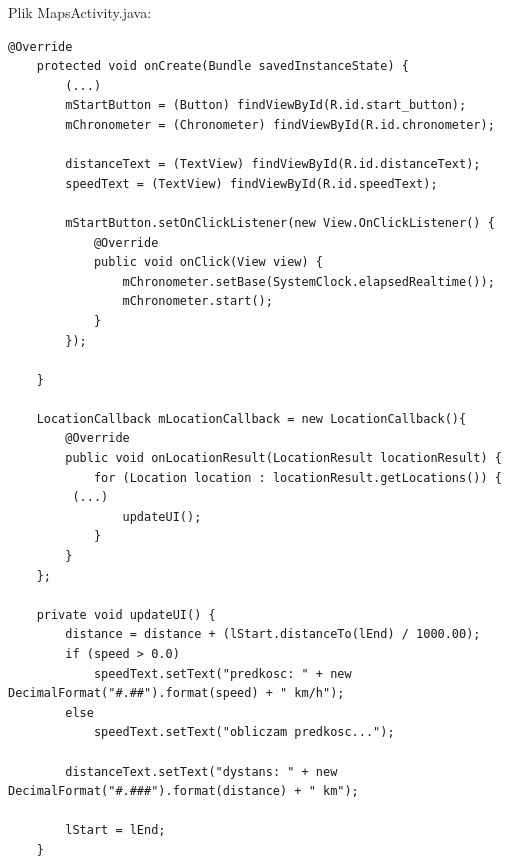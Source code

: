 \documentclass[a4paper]{article}
\begin{document}
Plik MapsActivity.java:
\begin{lstlisting}[style=java]
    @Override
    protected void onCreate(Bundle savedInstanceState) {
        (...)
        mStartButton = (Button) findViewById(R.id.start_button);
        mChronometer = (Chronometer) findViewById(R.id.chronometer);

        distanceText = (TextView) findViewById(R.id.distanceText);
        speedText = (TextView) findViewById(R.id.speedText);

        mStartButton.setOnClickListener(new View.OnClickListener() {
            @Override
            public void onClick(View view) {
                mChronometer.setBase(SystemClock.elapsedRealtime());
                mChronometer.start();
            }
        });

    }

    LocationCallback mLocationCallback = new LocationCallback(){
        @Override
        public void onLocationResult(LocationResult locationResult) {
            for (Location location : locationResult.getLocations()) {
 	     (...)
                updateUI();
            }
        }
    };

    private void updateUI() {
        distance = distance + (lStart.distanceTo(lEnd) / 1000.00);
        if (speed > 0.0)
            speedText.setText("predkosc: " + new DecimalFormat("#.##").format(speed) + " km/h");
        else
            speedText.setText("obliczam predkosc...");

        distanceText.setText("dystans: " + new DecimalFormat("#.###").format(distance) + " km");

        lStart = lEnd;
    }


\end{lstlisting}
\end{document}
